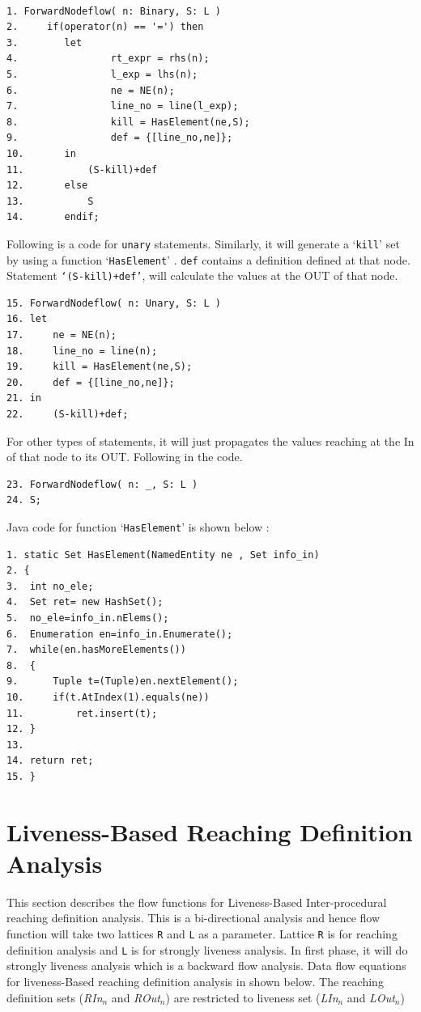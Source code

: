 \documentclass[11pt,a4paper,openright]{report}
\begin{document}
\begin{lstlisting}[]  % Start your code-block

1. ForwardNodeflow( n: Binary, S: L )
2.     if(operator(n) == '=') then   
3.        let        
4.                rt_expr = rhs(n);
5.                l_exp = lhs(n);
6.                ne = NE(n);
7.                line_no = line(l_exp);
8.                kill = HasElement(ne,S); 
9.                def = {[line_no,ne]};
10.       in
11.       	  (S-kill)+def        
12.       else
13.        	  S
14.       endif;
\end{lstlisting}

Following is a code for \texttt{unary} statements. Similarly, it will generate a `\texttt{kill}' set by using a function `\texttt{HasElement}' 
. \texttt{def} contains a definition defined at that node. Statement \texttt{`(S-kill)+def'}, will calculate the values at the OUT of that
node.
\begin{lstlisting}[]
15. ForwardNodeflow( n: Unary, S: L )
16.	let
17.		ne = NE(n);
18.		line_no = line(n);
19.		kill = HasElement(ne,S);
20.		def = {[line_no,ne]};
21.	in
22.		(S-kill)+def;
\end{lstlisting}

For other types of statements, it will just propagates the values reaching at the In of that node to its OUT. Following in the code.

\begin{lstlisting}[]
23. ForwardNodeflow( n: _, S: L ) 
24.	S;
\end{lstlisting}

Java code for function `\texttt{HasElement}' is shown below :
\begin{lstlisting}
1. static Set HasElement(NamedEntity ne , Set info_in)
2. {
3.	int no_ele;
4.	Set ret= new HashSet();
5.	no_ele=info_in.nElems();
6.	Enumeration en=info_in.Enumerate();
7.	while(en.hasMoreElements())
8.	{
9.		Tuple t=(Tuple)en.nextElement();
10.		if(t.AtIndex(1).equals(ne))
11.			ret.insert(t);
12.	}	
13.
14.	return ret;
15. }

\end{lstlisting}

\section{Liveness-Based Reaching Definition Analysis}
This section describes the flow functions for Liveness-Based Inter-procedural reaching definition analysis. This is a bi-directional
analysis and hence flow function will take two lattices \texttt{R} and \texttt{L} as a parameter. Lattice \texttt{R} is for reaching definition analysis and
\texttt{L} is for strongly liveness analysis. In first phase, it will do strongly liveness analysis which is a backward flow analysis.
Data flow equations for liveness-Based reaching definition analysis in shown below. The reaching definition sets (\textit{RIn}$_n$ and \textit{ROut}$_n$) are restricted 
to liveness set (\textit{LIn}$_n$ and \textit{LOut}$_n$)
\end{document}
